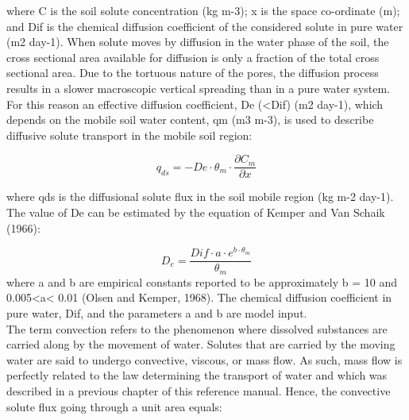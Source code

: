 where C is the soil solute concentration (kg m-3); x is the space co-ordinate (m); and Dif is the chemical diffusion coefficient of the considered solute in pure water (m2 day-1). When solute moves by diffusion in the water phase of the soil, the cross sectional area available for diffusion is only a fraction of the total cross sectional area. Due to the tortuous nature of the pores, the diffusion process results in a slower macroscopic vertical spreading than in a pure water system. For this reason an effective diffusion coefficient, De (<Dif) (m2 day-1), which depends on the mobile soil water content, qm (m3 m-3), is used to describe diffusive solute transport in the mobile soil region:

\begin{equation}
q_{ds} = - De \cdot \theta_m \cdot \frac{\partial C_m}{\partial x}
\end{equation}

where qds is the diffusional solute flux in the soil mobile region (kg m-2 day-1).
\\
The value of De can be estimated by the equation of Kemper and Van Schaik (1966):

\begin{equation}
D_e = \frac{Dif \cdot a \cdot e^{b\cdot \theta_m}}{\theta_m}
\end{equation}
where a and b are empirical constants reported to be approximately b = 10 and 0.005<a< 0.01 (Olsen and Kemper, 1968). The chemical diffusion coefficient in pure water, Dif, and the parameters a and b are model input.
\\
The term convection refers to the phenomenon where dissolved substances are carried along by the movement of water. Solutes that are carried by the moving water are said to undergo convective, viscous, or mass flow. As such, mass flow is perfectly related to the law determining the transport of water and which was described in a previous chapter of this reference manual. Hence, the convective solute flux going through a unit area equals:


